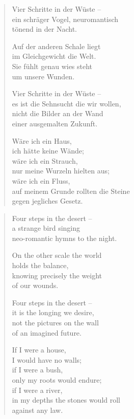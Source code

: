 
\cleartoverso



\begin{verse}

Vier Schritte in der Wüste --\\
ein schräger Vogel, neuromantisch\\
tönend in der Nacht.

Auf der anderen Schale liegt\\
im Gleichgewicht die Welt.\\
Sie fühlt genau wies steht\\
um unsere Wunden.

Vier Schritte in der Wüste --\\
es ist die Sehnsucht die wir wollen,\\
nicht die Bilder an der Wand\\
einer ausgemalten Zukunft.

Wäre ich ein Haus,\\
ich hätte keine Wände;\\
wäre ich ein Strauch,\\
nur meine Wurzeln hielten aus;\\
wäre ich ein Fluss,\\
auf meinem Grunde rollten die Steine\\
gegen jegliches Gesetz.

\end{verse}

\cleartorecto



\begin{verse}
Four steps in the desert --\\
a strange bird singing\\
neo-romantic hymns to the night.

On the other scale the world\\
holds the balance,\\
knowing precisely the weight\\
of our wounds.

Four steps in the desert --\\
it is the longing we desire,\\
not the pictures on the wall\\
of an imagined future.

If I were a house,\\
I would have no walls;\\
if I were a bush,\\
only my roots would endure;\\
if I were a river,\\
in my depths the stones would roll\\
against any law.

\end{verse}

